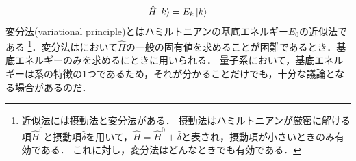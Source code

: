 \documentclass{report}
\begin{document}
  \begin{align}
    \hat{H}\ket{k} = E_k\ket{k}\label{SE}
  \end{align}
  変分法(variational principle)とはハミルトニアンの基底エネルギー$E_0$の近似法である
  \footnote{
    近似法には摂動法と変分法がある．
    摂動法はハミルトニアンが厳密に解ける項$\hat{H}^0$と摂動項$\hat{\delta}$を用いて，$\hat{H}=\hat{H}^0+\hat{\delta}$と表され，摂動項が小さいときのみ有効である．
    これに対し，変分法はどんなときでも有効である．
  }．変分法はにおいて$\hat{H}$の一般の固有値を求めることが困難であるとき．基底エネルギーのみを求めるにときに用いられる．
  量子系において，基底エネルギーは系の特徴の1つであるため，それが分かることだけでも，十分な議論となる場合があるのだ．
\end{document}
